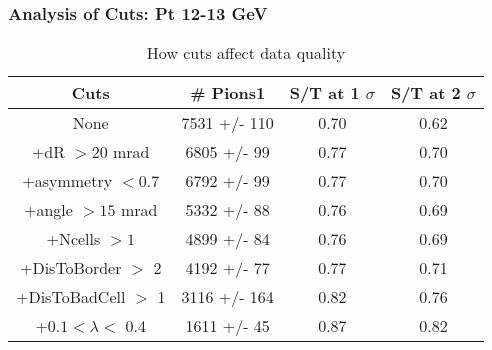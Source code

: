 \frame
{
\frametitle{Analysis of Cuts: Pt 12-13 GeV}
\begin{table}
\caption{How cuts affect data quality}
\centering
\begin{tabular}{c c c c}
\hline\hline
Cuts & \# Pions1 & S/T at 1 $\sigma$ & S/T at 2 $\sigma$ \\ [0.5ex]
\hline
None & 7531 +/-  110 & 0.70 & 0.62 \\ %
+dR $> 20$ mrad & 6805 +/-   99 & 0.77 & 0.70 \\ %
+asymmetry $< 0.7$ & 6792 +/-   99 & 0.77 & 0.70 \\ %
+angle $> 15$ mrad & 5332 +/-   88 & 0.76 & 0.69 \\ %
+Ncells $> 1$& 4899 +/-   84 & 0.76 & 0.69 \\ %
+DisToBorder $>$ 2 & 4192 +/-   77 & 0.77 & 0.71 \\ %
+DisToBadCell $>$ 1& 3116 +/-  164 & 0.82 & 0.76 \\ %
+$0.1 < \lambda <$ 0.4 & 1611 +/-   45 & 0.87 & 0.82 \\ %
[1ex]
\hline
\end{tabular}
\label{table:nonlin}
\end{table}
}
